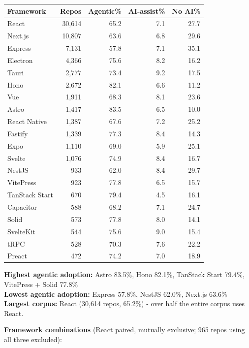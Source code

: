 \documentclass[10pt,a4paper]{article}
\begin{document}
\vspace{3pt}
\begin{tabular}{@{}lrrrr@{}}
\toprule
Framework & Repos & Agentic\% & AI-assist\% & No AI\% \\
\midrule
React          & 30,614 & 65.2 & 7.1 & 27.7 \\
Next.js        & 10,807 & 63.6 & 6.8 & 29.6 \\
Express        &  7,131 & 57.8 & 7.1 & 35.1 \\
Electron       &  4,366 & 75.6 & 8.2 & 16.2 \\
Tauri          &  2,777 & 73.4 & 9.2 & 17.5 \\
Hono           &  2,672 & 82.1 & 6.6 & 11.2 \\
Vue            &  1,911 & 68.3 & 8.1 & 23.6 \\
Astro          &  1,417 & 83.5 & 6.5 & 10.0 \\
React Native   &  1,387 & 67.6 & 7.2 & 25.2 \\
Fastify        &  1,339 & 77.3 & 8.4 & 14.3 \\
Expo           &  1,110 & 69.0 & 5.9 & 25.1 \\
Svelte         &  1,076 & 74.9 & 8.4 & 16.7 \\
NestJS         &    933 & 62.0 & 8.4 & 29.7 \\
VitePress      &    923 & 77.8 & 6.5 & 15.7 \\
TanStack Start &    670 & 79.4 & 4.5 & 16.1 \\
Capacitor      &    588 & 68.2 & 7.1 & 24.7 \\
Solid          &    573 & 77.8 & 8.0 & 14.1 \\
SvelteKit      &    544 & 75.6 & 9.0 & 15.4 \\
tRPC           &    528 & 70.3 & 7.6 & 22.2 \\
Preact         &    472 & 74.2 & 7.0 & 18.9 \\
\bottomrule
\end{tabular}

\vspace{6pt}
\textbf{Highest agentic adoption:} Astro 83.5\%, Hono 82.1\%, TanStack Start 79.4\%, VitePress + Solid 77.8\%\\
\textbf{Lowest agentic adoption:} Express 57.8\%, NestJS 62.0\%, Next.js 63.6\%\\
\textbf{Largest corpus:} React (30,614 repos, 65.2\%) - over half the entire corpus uses React.

\vspace{6pt}
\textbf{Framework combinations} (React paired, mutually exclusive; 965 repos using all three excluded):
\end{document}
